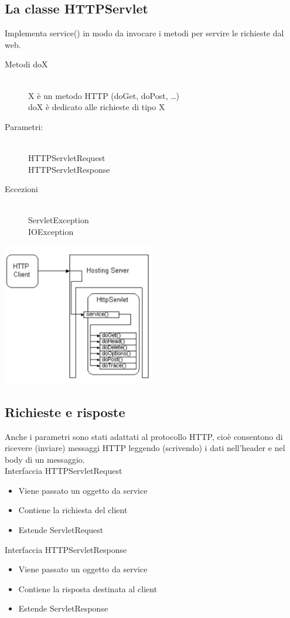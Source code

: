 \subsection{La classe HTTPServlet}
Implementa service() in modo da invocare i metodi per servire le richieste dal web.
\begin{description}
    \item[Metodi doX] 
    \\ X è un metodo HTTP (doGet, doPost, …)
    \\ doX è dedicato alle richieste di tipo X
    \item[Parametri:]
    \\ HTTPServletRequest
    \\ HTTPServletResponse
    \item[Eccezioni]
    \\ ServletException
    \\ IOException
\end{description}
\begin{center}
    \includegraphics[width=0.5\textwidth]{img/appWeb7.jpg}
\end{center}

\subsection{Richieste e risposte}
Anche i parametri sono stati adattati al protocollo HTTP, cioè consentono di ricevere (inviare) messaggi HTTP leggendo (scrivendo) i dati nell'header e nel body di un messaggio.
\\Interfaccia HTTPServletRequest
\begin{itemize}
    \item Viene passato un oggetto da service
    \item Contiene la richiesta del client
    \item Estende ServletRequest
\end{itemize}
Interfaccia HTTPServletResponse
\begin{itemize}
    \item Viene passato un oggetto da service
    \item Contiene la risposta destinata al client
    \item Estende ServletResponse
\end{itemize}

